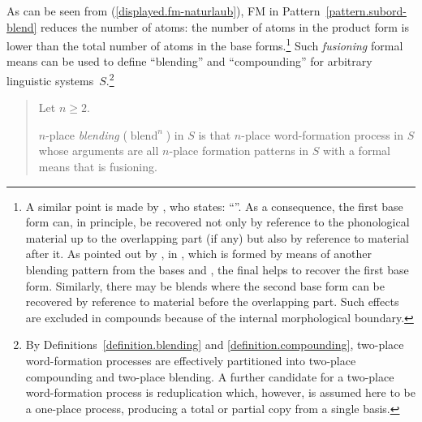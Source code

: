 \documentclass[output=paper
  ,nobabel
  ,draftmode
  ,colorlinks, citecolor=brown
]{langscibook}
\begin{document}
As can be seen from (\ref{displayed.fm-naturlaub}),
FM in Pattern \ref{pattern.subord-blend} reduces the
number of atoms: the number of atoms in the product form is lower than the total
number of atoms in the base forms.\footnote{A similar point is made by \citet[198]{plank:1981:morphologische:irregularitaeten}, who
states: ``''. As
a consequence, the first base form can, in principle, be recovered not only by
reference to the phonological material up to the overlapping part (if any) but
also by reference to material after it. As pointed out by \citet[296]{schulz:2004:jein:fortschrott}, in \emph{}, which is formed by means of another
blending pattern from the bases \emph{} and \emph{}, the final \emph{} helps to recover the first base form. Similarly,
there may be blends where the second base form can be recovered by reference to
material before the overlapping part. Such effects are excluded in compounds
because of the internal morphological boundary.} Such
\emph{fusioning} formal means can be used to define ``blending'' and ``compounding'' for arbitrary linguistic systems $S$.\footnote{By Definitions \ref{definition.blending} and \ref{definition.compounding}, two-place word-formation processes are
effectively partitioned into two-place compounding and two-place blending. A
further candidate for a two-place word-formation process is reduplication which,
however, is assumed here to be a one-place process, producing a total or partial
copy from a single basis.} \begin{quotation}
\begin{definition}
\label{definition.blending}Let $n≥2$.

\noindent $n$-place \emph{blending} ($\operatorname{blend}^{n}$) in $S$ is that $n$-place word-formation process in $S$ whose arguments are all $n$-place formation patterns in $S$ with a formal means that is fusioning.
\end{definition}
\end{quotation}
\end{document}
